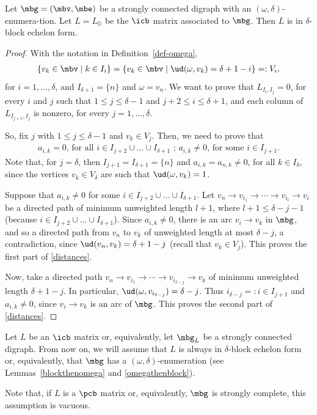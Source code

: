 \begin{lemma}\label{omegathenblock}
Let $\mbg=(\mbv,\mbe)$ be a strongly connected digraph with an
$(\omega,\delta)$-enumera-tion. Let $L=L_{\mathbb{G}}$ be the $\icb$
matrix associated to $\mbg$. Then $L$ is in $\delta$-block echelon
form.
\end{lemma}
\begin{proof}
With the notation in Definition~\ref{def-omega}, 
\begin{eqnarray*}
\{v_k\in \mbv\mid
k\in I_i\}=\{v_k\in \mbv\mid \ud(\omega,v_k)=\delta+1-i\}=:V_i, 
\end{eqnarray*}
for $i=1,\ldots ,\delta$, and $I_{\delta+1}=\{n\}$ and $\omega=v_n$.
We want to prove that $L_{I_{i},I_{j}}=0$, for every $i$ and $j$ such
that $1\leq j\leq \delta-1$ and $j+2\leq i\leq \delta+1$, and each
column of $L_{I_{j+1},I_j}$ is nonzero, for every $j=1,\ldots
,\delta$.

So, fix $j$ with $1\leq j\leq \delta-1$ and $v_k\in V_j$. Then, we
need to prove that
\begin{eqnarray}\label{distances}
a_{i,k}=0\mbox{, for all }i\in I_{j+2}\cup\ldots \cup
  I_{\delta+1}\mbox{ ; } a_{i,k}\neq 0\mbox{, for some }i\in I_{j+1}.
\end{eqnarray}
Note that, for $j=\delta$, then $I_{j+1}=I_{\delta+1}=\{n\}$ and
$a_{i,k}=a_{n,k}\neq 0$, for all $k\in I_\delta$, since the vertices
$v_k\in V_\delta$ are such that $\ud(\omega,v_k)=1$.

Suppose that $a_{i,k}\neq 0$ for some $i\in I_{j+2}\cup\ldots \cup
I_{\delta+1}$. Let $v_n\to v_{i_1}\to \cdots \to v_{i_l}\to v_i$ be a
directed path of minimum unweighted length $l+1$, where $l+1\leq
\delta-j-1$ (because $i\in I_{j+2}\cup\ldots \cup
I_{\delta+1}$). Since $a_{i,k}\neq 0$, there is an arc $v_i\to v_k$ in
$\mbg$, and so a directed path from $v_n$ to $v_k$ of unweighted
length at most $\delta-j$, a contradiction, since
$\ud(v_n,v_k)=\delta+1-j$ (recall that $v_k\in V_j$). This proves the
first part of \eqref{distances}.

Now, take a directed path $v_n\to v_{i_1}\to \cdots \to
v_{i_{\delta-j}}\to v_k$ of minimum unweighted length
$\delta+1-j$. In particular, $\ud(\omega
,v_{i_{\delta-j}})=\delta-j$. Thus $i_{\delta-j}=:i\in I_{j+1}$ and
$a_{i,k}\neq 0$, since $v_i\to v_k$ is an arc of $\mbg$. This proves the
second part of \eqref{distances}.
\end{proof}

\begin{assumption}\label{echelon-omega}
Let $L$ be an $\icb$ matrix or, equivalently, let $\mbg_L$ be a
strongly connected digraph. From now on, we will assume that $L$ is
always in $\delta$-block echelon form or, equivalently, that $\mbg$
has a $(\omega,\delta)$-enumeration (see Lemmas~\ref{blockthenomega}
and \ref{omegathenblock}).

Note that, if $L$ is a $\pcb$ matrix or, equivalently, $\mbg$ is
strongly complete, this assumption is vacuous.
\end{assumption}

